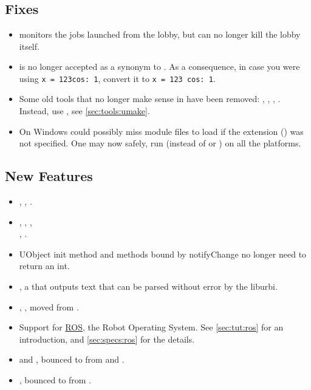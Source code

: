\section{}

\subsection{Fixes}
\begin{itemize}
\item {} monitors the jobs launched from the
  lobby, but can no longer kill the lobby itself.
\item {} is no longer accepted as a synonym to .
  As a consequence, in case you were using \lstinline|x = 123cos: 1|,
  convert it to \lstinline|x = 123 cos: 1|.
\item Some old tools that no longer make sense in  have been
  removed: , ,
  , .  Instead, use
  , see \autoref{sec:tools:umake}.
\item On Windows  could possibly miss module files to
  load if the extension () was not specified.  One may now
  safely, run  (instead of  or ) on all the platforms.
\end{itemize}

\subsection{New Features}
\begin{itemize}
\item {}, ,
  .
\item {}, ,
  , \\
  , .
\item UObject init method and methods bound by notifyChange no longer need
  to return an int.
\item {}, a  that outputs text
  that can be parsed without error by the liburbi.
\item {}, , moved from
  .
\item Support for \href{http://www.ros.org}{ROS}, the Robot Operating
  System.  See \autoref{sec:tut:ros} for an introduction, and
  \autoref{sec:specs:ros} for the details.
\item {} and , bounced to from
   and .
\item {}, bounced to from .
\end{itemize}

